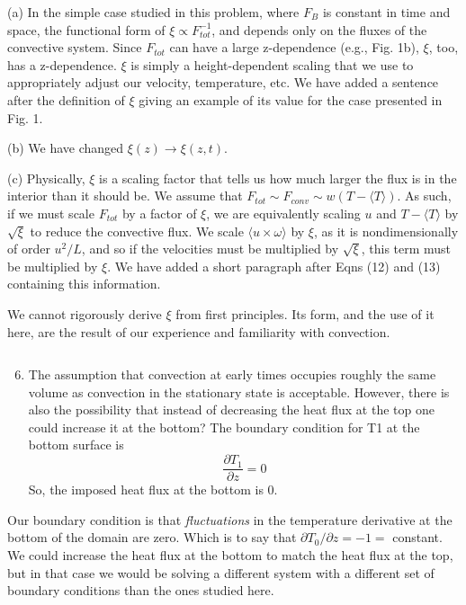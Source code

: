 \documentclass[aps, 11pt, singlecolumn]{revtex4-1} %
\begin{document}
\begin{singlespace}
(a) In the simple case studied in this problem, where $F_B$ is constant in time
and space, the functional form of $\xi \propto F_{tot}^{-1}$, and depends only
on the fluxes of the convective system. Since $F_{tot}$ can
have a large z-dependence (e.g., Fig. 1b), $\xi$, too, has a z-dependence. 
$\xi$ is simply a height-dependent scaling that we use to appropriately
adjust our velocity, temperature, etc. We have added a sentence after the 
definition of $\xi$ giving an example of its value for the case presented in
Fig. 1.

(b) We have changed $\xi(z) \rightarrow \xi(z, t)$.

(c) Physically, $\xi$ is a scaling factor that tells us how much larger the flux
is in the interior than it should be. 
We assume that $F_{tot} \sim F_{conv} \sim w (T - \langle T \rangle )$.
As such, if we must scale $F_{tot}$ by a factor of $\xi$, we are equivalently
scaling
$u$ and $T - \langle T\rangle$ by $\sqrt{\xi}$ to reduce the convective flux.
We scale $\langle u\times \omega\rangle$ by $\xi$, as it is
nondimensionally of order $u^2 / L$, and so if the velocities must be multiplied
by $\sqrt{\xi}$, this term must be multiplied by $\xi$. We have added a short
paragraph after Eqns (12) and (13) containing this information.

We cannot rigorously derive $\xi$ from first principles. Its form, and the use of
it here, are the result of our experience and familiarity with convection. 

\begin{myquotation}
$\,$\\\vspace{-1.25cm}
\begin{enumerate}
\setcounter{enumi}{5}
\item The assumption that convection at early times occupies roughly the same volume as convection in the stationary state is acceptable. However, there is also the possibility that instead of decreasing the heat flux at the top one could increase it at the bottom? The boundary condition for T1 at the bottom surface is
$$
\frac{\partial T_1}{\partial z} = 0
$$
So, the imposed heat flux at the bottom is 0.
\end{enumerate}
\end{myquotation}
Our boundary condition is that \emph{fluctuations} in the temperature derivative at the
bottom of the domain are zero. Which is to say that 
$\partial T_0 / \partial z = -1 =$ constant. We could increase the heat flux at
the bottom to match the heat flux at the top, but in that case we would be solving
a different system with a different set of boundary conditions than the ones
studied here. 


\end{singlespace}
\end{document}
